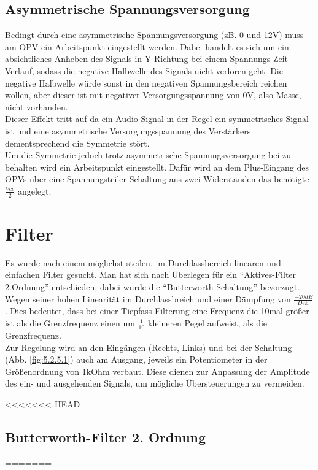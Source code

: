 \subsection{Asymmetrische Spannungsversorgung}\label{subsec3.2.5}
Bedingt durch eine asymmetrische Spannungsversorgung (zB. 0 und 12V) muss am OPV ein Arbeitspunkt eingestellt werden. Dabei handelt es sich um ein absichtliches Anheben des Signals in Y-Richtung bei einem Spannungs-Zeit-Verlauf, sodass die negative Halbwelle des Signals nicht verloren geht. Die negative Halbwelle würde sonst in den negativen Spannungsbereich reichen wollen, aber dieser ist mit negativer Versorgungsspannung von 0V, also Masse, nicht vorhanden.\\
Dieser Effekt tritt auf da ein Audio-Signal in der Regel ein symmetrisches Signal ist und eine asymmetrische Versorgungsspannung des Verstärkers dementsprechend die Symmetrie stört.\\
Um die Symmetrie jedoch trotz asymmetrische Spannungsversorgung bei zu behalten wird ein Arbeitspunkt eingestellt. Dafür wird an dem Plus-Eingang des OPVs über eine Spannungsteiler-Schaltung aus zwei Widerständen das benötigte $\frac{Vcc}{2}$ angelegt.


\section{Filter}\label{sec:3.3}
Es wurde nach einem möglichst steilen, im Durchlassbereich linearen und einfachen Filter gesucht. Man hat sich nach Überlegen für ein \enquote{Aktives-Filter 2.Ordnung} entschieden, dabei wurde die \enquote{Butterworth-Schaltung} bevorzugt. Wegen seiner hohen Linearität im Durchlassbreich und einer Dämpfung von $\frac{-20dB}{Dek.}$ . Dies bedeutet, dass bei einer Tiepfass-Filterung eine Frequenz die 10mal größer ist als die Grenzfrequenz einen um $\frac{1}{10}$ kleineren Pegel aufweist, als die Grenzfrequenz.\\
Zur Regelung wird an den Eingängen (Rechts, Links) und bei der Schaltung (Abb. \ref{fig:5.2.5.1}) auch am Ausgang, jeweils ein Potentiometer in der Größenordnung von 1kOhm verbaut. Diese dienen zur Anpassung der Amplitude des ein- und ausgehenden Signals, um mögliche Übersteuerungen zu vermeiden.

<<<<<<< HEAD
\subsection{Butterworth-Filter 2. Ordnung}\label{subsec:3.3.1}
=======

